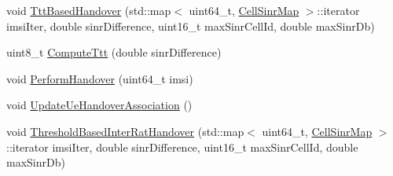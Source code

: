 \begin{DoxyCompactItemize}
\item 
void \hyperlink{classns3_1_1LteEnbRrc_a3f879b8dee06a9daf27e4c1b9f2a9099}{Ttt\+Based\+Handover} (std\+::map$<$ uint64\+\_\+t, \hyperlink{namespacens3_a1a41652a34d3ad5a6fb5d9a0f57e29f8}{Cell\+Sinr\+Map} $>$\+::iterator imsi\+Iter, double sinr\+Difference, uint16\+\_\+t max\+Sinr\+Cell\+Id, double max\+Sinr\+Db)
\item 
uint8\+\_\+t \hyperlink{classns3_1_1LteEnbRrc_a10f21eb00cdcfe24bcbcd8cddd823029}{Compute\+Ttt} (double sinr\+Difference)
\item 
void \hyperlink{classns3_1_1LteEnbRrc_af70b54878c6ee756e20bc959e58b1ea0}{Perform\+Handover} (uint64\+\_\+t imsi)
\item 
void \hyperlink{classns3_1_1LteEnbRrc_a132982c39284f927b10b261b17b82a7a}{Update\+Ue\+Handover\+Association} ()
\item 
void \hyperlink{classns3_1_1LteEnbRrc_aee1650bb9ecb5fca53f1d1f279338345}{Threshold\+Based\+Inter\+Rat\+Handover} (std\+::map$<$ uint64\+\_\+t, \hyperlink{namespacens3_a1a41652a34d3ad5a6fb5d9a0f57e29f8}{Cell\+Sinr\+Map} $>$\+::iterator imsi\+Iter, double sinr\+Difference, uint16\+\_\+t max\+Sinr\+Cell\+Id, double max\+Sinr\+Db)
\end{DoxyCompactItemize}
